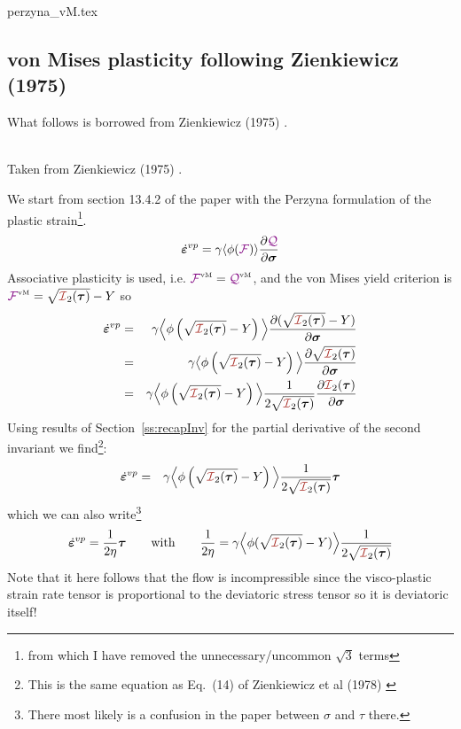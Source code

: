 \begin{flushright} {\tiny {\color{gray} perzyna\_vM.tex}} \end{flushright}

\subsection{von Mises plasticity following Zienkiewicz (1975)}

What follows is borrowed from Zienkiewicz (1975) \cite{zien75}.

\begin{center}
\\
{\captionfont Taken from Zienkiewicz (1975) \cite{zien75}.}
\end{center}

We start from section 13.4.2 of the paper with the Perzyna formulation of the plastic 
strain\footnote{from which I have removed the unnecessary/uncommon $\sqrt 3$ terms}. 
\[
\dot{\bm \varepsilon}^{vp} = \gamma \langle \phi({{\color{violet}\cal F}}) \rangle \frac{\partial {\color{violet}\cal Q}}{\partial \bm\sigma}
\]
Associative plasticity is used, i.e. ${{\color{violet}\cal F}}^{\text{\tiny vM}}={\cal {\color{violet}\cal Q}}^{\text{\tiny vM}}$, and the von Mises yield
criterion is ${\FFF}^{\text{\tiny vM}}=\sqrt{{\III}_2(\bm \tau)}- Y$ so
\begin{eqnarray}
\dot{\bm \varepsilon}^{vp} 
&=& \gamma \Big\langle \phi\left(\sqrt{{\III}_2(\bm \tau)}- Y\right)  \Big\rangle 
\frac{\partial (\sqrt{{\III}_2(\bm \tau)}- Y)}{\partial \bm\sigma} \nn\\
&=& \gamma \big\langle \phi\left(\sqrt{{\III}_2(\bm \tau)}- Y\right)  \Big\rangle 
\frac{\partial \sqrt{{\III}_2(\bm \tau)}}{\partial \bm\sigma} \nn\\
&=& \gamma \Big\langle \phi\left(\sqrt{{\III}_2(\bm \tau)}- Y\right)  \Big\rangle 
\frac{1}{2 \sqrt{{\III}_2(\bm \tau)}} \frac{\partial {\III}_2(\bm \tau)}{\partial \bm\sigma}
\end{eqnarray}
Using results of Section~\ref{ss:recapInv} for the partial derivative of the second invariant
we find\footnote{This is the same equation as Eq.~(14) of Zienkiewicz et al (1978) \cite{zijo78}}:
\begin{eqnarray}
\dot{\bm \varepsilon}^{vp} 
&=& \gamma \Big\langle \phi\left(\sqrt{{\III}_2(\bm \tau)}- Y \right)  \Big\rangle 
\frac{1}{2 \sqrt{{\III}_2(\bm \tau)}} {\bm \tau}
\end{eqnarray}
which we can also write\footnote{There most likely is a confusion in 
the paper between $\sigma$ and $\tau$ there.}
\[
\dot{\bm \varepsilon}^{vp} =
\frac{1}{2\eta} \bm\tau
\qquad
{\rm with}
\qquad
\frac{1}{2\eta} = \gamma \Big\langle \phi(\sqrt{{\III}_2(\bm \tau)}- Y) \Big\rangle 
\frac{1}{2 \sqrt{{\III}_2(\bm \tau)}}
\]
Note that it here follows that the flow is incompressible since 
the visco-plastic strain rate tensor is proportional to the deviatoric stress tensor
so it is deviatoric itself!

